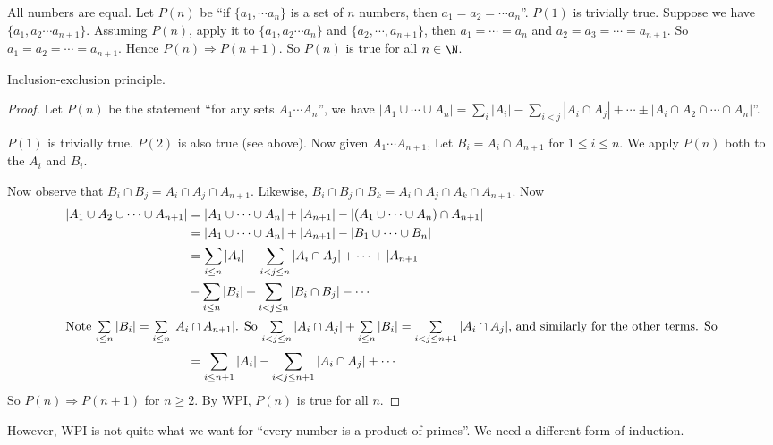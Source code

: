 \documentclass[a4paper]{article}
\begin{document}
\begin{eg}
  All numbers are equal. Let $P(n)$ be ``if $\{a_1, \cdots a_n\}$ is a set of $n$ numbers, then $a_1 = a_2 = \cdots a_n$''. $P(1)$ is trivially true. Suppose we have $\{a_1, a_2\cdots a_{n+1}\}$. Assuming $P(n)$, apply it to $\{a_1, a_2\cdots a_n\}$ and $\{a_2, \cdots , a_{n + 1}\}$, then $a_1 = \cdots = a_n$ and $a_2 = a_3 = \cdots = a_{n + 1}$. So $a_1 = a_2 = \cdots = a_{n + 1}$. Hence $P(n)\Rightarrow P(n + 1)$. So $P(n)$ is true for all $n\in \N$.
\end{eg}

\begin{thm}
  Inclusion-exclusion principle.
\end{thm}

\begin{proof}
  Let $P(n)$ be the statement ``for any sets $A_1\cdots A_n$'', we have $|A_1\cup \cdots \cup A_n| = \sum_i|A_i| - \sum_{i < j} |A_i\cap A_j| + \cdots \pm |A_i\cap A_2\cap \cdots \cap A_n|$''.

  $P(1)$ is trivially true. $P(2)$ is also true (see above). Now given $A_1 \cdots A_{n + 1}$, Let $B_i = A_i\cap A_{n + 1}$ for $1 \leq i\leq n$. We apply $P(n)$ both to the $A_i$ and $B_i$.

  Now observe that $B_i\cap B_j = A_i\cap A_j \cap A_{n + 1}$. Likewise, $B_i\cap B_j\cap B_k = A_i\cap A_j\cap A_k\cap A_{n + 1}$. Now
  \begin{align*}
    |A_1\cup A_2\cup \cdots \cup A_{n + 1}| &= |A_1\cup \cdots \cup A_n| + |A_{n + 1}| - |(A_1\cup\cdots\cup A_n)\cap A_{n + 1}|\\
    &= |A_1\cup \cdots \cup A_n| + |A_{n + 1}| - |B_{1}\cup \cdots \cup B_n|\\
    &= \sum_{i\leq n}|A_i| - \sum_{i < j\leq n}|A_i\cap A_j| + \cdots + |A_{n + 1}| \\
    &-\sum_{i \leq n}|B_i| + \sum_{i < j\leq n}|B_i\cap B_j| - \cdots \\
    \intertext{Note $\sum\limits_{i\leq n}|B_i| = \sum\limits_{i\leq n}|A_i\cap A_{n + 1}|$. So $\sum\limits_{i < j\leq n}|A_i\cap A_j| + \sum\limits_{i\leq n}|B_i| = \sum\limits_{i< j \leq n + 1}|A_i \cap A_j|$, and similarly for the other terms. So}
    &= \sum_{i \leq n + 1}|A_i| - \sum_{i< j \leq n + 1}|A_i \cap A_j| + \cdots
  \end{align*}
  So $P(n)\Rightarrow P(n + 1)$ for $n\geq 2$. By WPI, $P(n)$ is true for all $n$.
\end{proof}

However, WPI is not quite what we want for ``every number is a product of primes''. We need a different form of induction.
\end{document}
